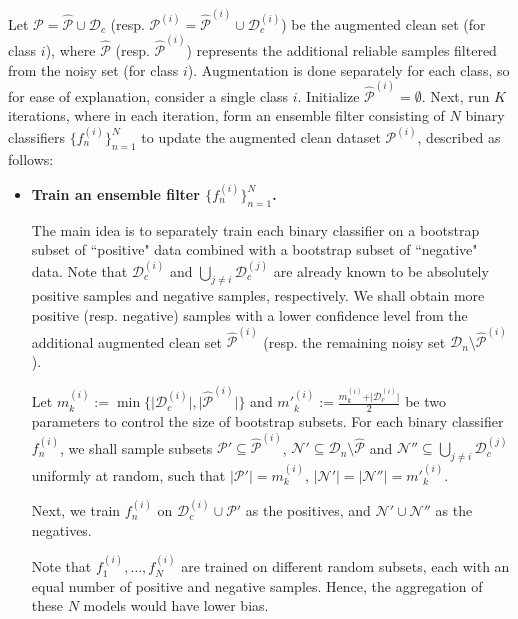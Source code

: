 \documentclass[conference]{IEEEtran}
\begin{document}
Let $\mathcal{P}=\hat{\mathcal{P}}\cup\mathcal{D}_c$ (resp. $\mathcal{P}^{(i)}=\hat{\mathcal{P}}^{(i)}\cup\mathcal{D}_c^{(i)}$) be the augmented clean set (for class $i$), where $\hat{\mathcal{P}}$ (resp. $\hat{\mathcal{P}}^{(i)}$) represents the additional reliable samples filtered from the noisy set (for class $i$).
Augmentation is done separately for each class, so for ease of explanation, consider a single class $i$.
Initialize $\hat{\mathcal{P}}^{(i)}=\emptyset$.
Next, run $K$ iterations, where in each iteration, form an ensemble filter consisting of $N$ binary classifiers $\{f^{(i)}_n\}_{n=1}^N$ to update the augmented clean dataset $\mathcal{P}^{(i)}$, described as follows: 
\begin{itemize}

\item \textbf{Train an ensemble filter $\{f^{(i)}_n\}_{n=1}^N$.}

The main idea is to separately train each binary classifier on a bootstrap subset of ``positive" data combined with a bootstrap subset of ``negative" data.
Note that $\mathcal{D}^{(i)}_c$ and $\textstyle\bigcup_{j\neq i}\mathcal{D}_c^{(j)}$ are already known to be absolutely positive samples and negative samples, respectively.
We shall obtain more positive (resp. negative) samples with a lower confidence level from the additional augmented clean set $\hat{\mathcal{P}}^{(i)}$ (resp. the remaining noisy set $\mathcal{D}_n\setminus \hat{\mathcal{P}}^{(i)}$).


Let $m_k^{(i)} := \min\{\vert \mathcal{D}_c^{(i)} \vert, \vert \hat{\mathcal{P}}^{(i)} \vert\}$ and $m'^{(i)}_k :=\frac{m_k^{(i)}+\vert \mathcal{D}_c^{(i)}\vert}{2}$ be two parameters to control the size of bootstrap subsets.
For each binary classifier $f^{(i)}_n$, we shall sample subsets $\mathcal{P}'\subseteq\hat{\mathcal{P}}^{(i)}$, $\mathcal{N}'\subseteq\mathcal{D}_n\setminus \hat{\mathcal{P}}$ and $\mathcal{N}''\subseteq \textstyle\bigcup_{j\neq i}\mathcal{D}_c^{(j)}$ uniformly at random, such that $\vert \mathcal{P}'\vert=m_k^{(i)}$, $\vert \mathcal{N}'\vert=\vert \mathcal{N}''\vert=m'^{(i)}_k$.

Next, we train $f^{(i)}_n$ on $\mathcal{D}_c^{(i)}\cup \mathcal{P}'$ as the positives, and $\mathcal{N}' \cup \mathcal{N}''$ as the negatives.

Note that $f^{(i)}_1, \dots, f^{(i)}_N$ are trained on different random subsets, each with an equal number of positive and negative samples. 
Hence, the aggregation of these $N$ models would have lower bias.



\end{itemize}
\end{document}
